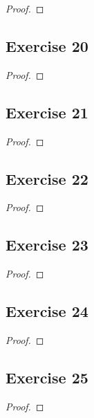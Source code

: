 \documentclass[14pt]{extarticle}
\begin{document}
\begin{proof}

\end{proof}

\subsection{Exercise 20}

\begin{proof}

\end{proof}

\subsection{Exercise 21}

\begin{proof}

\end{proof}

\subsection{Exercise 22}

\begin{proof}

\end{proof}

\subsection{Exercise 23}

\begin{proof}

\end{proof}

\subsection{Exercise 24}

\begin{proof}

\end{proof}

\subsection{Exercise 25}

\begin{proof}

\end{proof}
\end{document}
